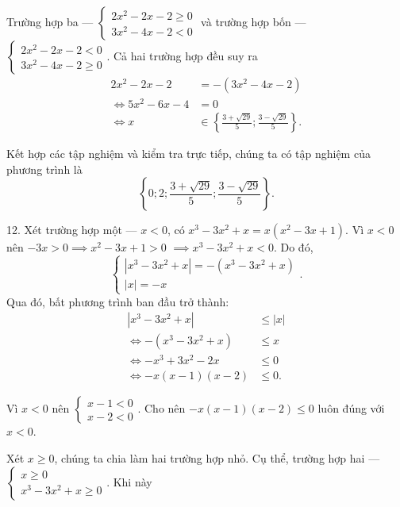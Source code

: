 \textcolor{colorEmphasis}{Trường hợp ba --- $
\begin{cases}
   2x^2 - 2x - 2 \geq 0 \\
   3x^2 - 4x - 2 < 0
\end{cases}$} và \textcolor{colorEmphasis}{trường hợp bốn --- $
\begin{cases}
   2x^2 - 2x - 2 < 0 \\
   3x^2 - 4x - 2 \geq 0
\end{cases}$}. Cả hai trường hợp đều suy ra
\begin{align*}
   2x^2 - 2x - 2 &= -\left(3x^2 - 4x - 2\right) \\
   \iff 5x^2 - 6x - 4 &= 0 \\
   \iff x &\in \left\{\frac{3 + \sqrt{29}}{5}; \frac{3 - \sqrt{29}}{5}\right\}.
\end{align*}

Kết hợp các tập nghiệm và kiểm tra trực tiếp, chúng ta có tập nghiệm của phương trình là $$\left\{0; 2; \frac{3 + \sqrt{29}}{5}; \frac{3 - \sqrt{29}}{5}\right\}.$$

12. Xét \textcolor{colorEmphasisCyan}{trường hợp một --- $x < 0$}, có $x^3 - 3x^2 + x = x\left(x^2 - 3x + 1\right)$. Vì $x < 0$ nên $-3x > 0 \implies x^2 - 3x + 1 > 0$ $\implies x^3 - 3x^2 + x < 0$. Do đó,
$$
\begin{cases}
   |x^3 - 3x^2 + x| = -\left(x^3 - 3x^2 + x\right) \\
   |x| = -x
\end{cases}.
$$
Qua đó, bất phương trình ban đầu trở thành:
\begin{align*}
   \left|x^3 - 3x^2 + x\right| &\leq \left|x\right| \\
   \iff -\left(x^3 - 3x^2 + x\right) &\leq x \\
   \iff -x^3 + 3x^2 - 2x &\leq 0 \\
   \iff -x(x-1)(x-2) &\leq 0.
\end{align*}

Vì $x < 0$ nên $\begin{cases}
   x - 1 < 0 \\
   x - 2 < 0
\end{cases}$. Cho nên $-x(x-1)(x-2) \leq 0$ luôn đúng với $x < 0$.

Xét $x \geq 0$, chúng ta chia làm hai trường hợp nhỏ. Cụ thể, \textcolor{colorEmphasis}{trường hợp hai --- $\begin{cases}
   x \geq 0 \\
   x^3 - 3x^2 + x \geq 0
\end{cases}$}. Khi này

